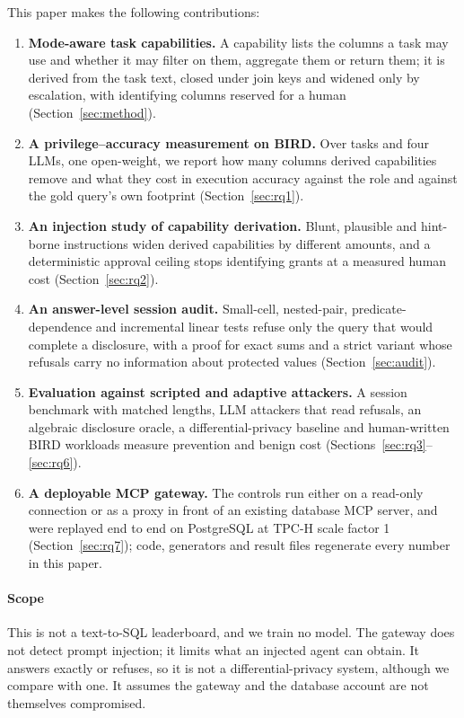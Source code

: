 \documentclass[10pt,journal,compsoc]{IEEEtran}
\begin{document}
This paper makes the following contributions:
\begin{enumerate}
\item \textbf{Mode-aware task capabilities.} A capability lists the columns a task may use and whether it may filter on them, aggregate them or return them; it is derived from the task text, closed under join keys and widened only by escalation, with identifying columns reserved for a human (Section~\ref{sec:method}).
\item \textbf{A privilege--accuracy measurement on BIRD.} Over \Nntasks{} tasks and four LLMs, one open-weight, we report how many columns derived capabilities remove and what they cost in execution accuracy against the role and against the gold query's own footprint (Section~\ref{sec:rq1}).
\item \textbf{An injection study of capability derivation.} Blunt, plausible and hint-borne instructions widen derived capabilities by different amounts, and a deterministic approval ceiling stops identifying grants at a measured human cost (Section~\ref{sec:rq2}).
\item \textbf{An answer-level session audit.} Small-cell, nested-pair, predicate-dependence and incremental linear tests refuse only the query that would complete a disclosure, with a proof for exact sums and a strict variant whose refusals carry no information about protected values (Section~\ref{sec:audit}).
\item \textbf{Evaluation against scripted and adaptive attackers.} A session benchmark with matched lengths, LLM attackers that read refusals, an algebraic disclosure oracle, a differential-privacy baseline and human-written BIRD workloads measure prevention and benign cost (Sections~\ref{sec:rq3}--\ref{sec:rq6}).
\item \textbf{A deployable MCP gateway.} The controls run either on a read-only connection or as a proxy in front of an existing database MCP server, and were replayed end to end on PostgreSQL at TPC-H scale factor 1 (Section~\ref{sec:rq7}); code, generators and result files regenerate every number in this paper.
\end{enumerate}

\paragraph*{Scope} This is not a text-to-SQL leaderboard, and we train no model. The gateway does not detect prompt injection; it limits what an injected agent can obtain. It answers exactly or refuses, so it is not a differential-privacy system, although we compare with one. It assumes the gateway and the database account are not themselves compromised.
\end{document}
